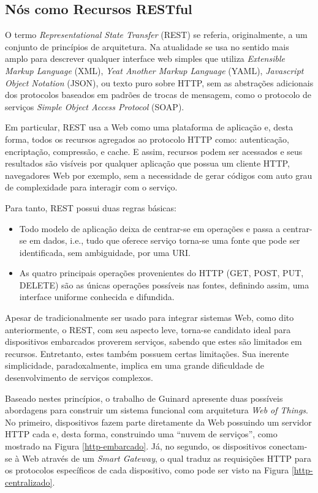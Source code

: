 \documentclass[12pt,a4paper,oneside]{report}
\begin{document}
\subsection{Nós como Recursos RESTful}

O termo \emph{Representational State Transfer} (REST)\cite{w3curi} se referia, originalmente, a um conjunto de princípios de arquitetura. Na atualidade se usa no sentido mais amplo para descrever qualquer interface web simples que utiliza \emph{Extensible Markup Language} (XML)\cite{w3cxml}, \emph{Yeat Another Markup Language} (YAML)\cite{yaml}, \emph{Javascript Object Notation} (JSON)\cite{json}, ou texto puro sobre HTTP, sem as abstrações adicionais dos protocolos baseados em padrões de trocas de mensagem, como o protocolo de serviços \emph{Simple Object Access Protocol} (SOAP)\cite{w3csoap}.

Em particular, REST usa a Web como uma plataforma de aplicação e, desta forma, todos os recursos agregados ao protocolo HTTP como: autenticação, encriptação, compressão, e cache. E assim, recursos podem ser acessados e seus resultados são visíveis por qualquer aplicação que possua um cliente HTTP, navegadores Web por exemplo, sem a necessidade de gerar códigos com auto grau de complexidade para interagir com o serviço.

Para tanto, REST possui duas regras básicas: 
\begin{itemize}
  \item Todo modelo de aplicação deixa de centrar-se em operações e passa a centrar-se em dados, i.e., tudo que oferece serviço torna-se uma fonte que pode ser identificada, sem ambiguidade, por uma URI. 
  \item As quatro principais operações provenientes do HTTP (GET, POST, PUT, DELETE) são as únicas operações possíveis nas fontes, definindo assim, uma interface uniforme conhecida e difundida. 
\end{itemize}

Apesar de tradicionalmente ser usado para integrar sistemas Web, como dito anteriormente, o REST, com seu aspecto leve, torna-se candidato ideal para dispositivos embarcados proverem serviços, sabendo que estes são limitados em recursos. Entretanto, estes também possuem certas limitações. Sua inerente simplicidade, paradoxalmente, implica em uma grande dificuldade de desenvolvimento de serviços complexos.

Baseado nestes princípios, o trabalho de Guinard \cite{wotdovad} apresente duas possíveis abordagens para construir um sistema funcional com arquitetura \emph{Web of Things}. No primeiro, dispositivos fazem parte diretamente da Web possuindo um servidor HTTP cada e, desta forma, construindo uma ``nuvem de serviços'', como mostrado na Figura \ref{http-embarcado}. Já, no segundo, os dispositivos conectam-se à Web através de um \emph{Smart Gateway}, o qual traduz as requisições HTTP para os protocolos específicos de cada dispositivo, como pode ser visto na Figura \ref{http-centralizado}.
\end{document}
